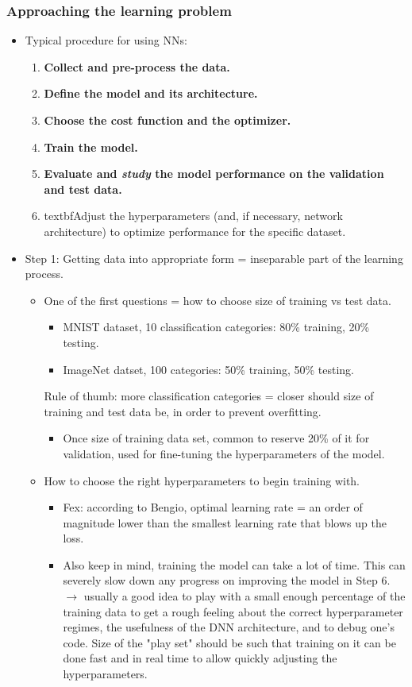 \documentclass[norsk,a4paper,11pt]{article}
\begin{document}
\subsubsection{Approaching the learning problem}
\begin{itemize}
	\item Typical procedure for using NNs:
	\begin{enumerate}
		\item \textbf{Collect and pre-process the data.}
		\item \textbf{Define the model and its architecture.}
		\item \textbf{Choose the cost function and the optimizer.}
		\item \textbf{Train the model.}
		\item \textbf{Evaluate and \textit{study} the model performance on the validation and test data.}
		\item textbf{Adjust the hyperparameters (and, if necessary, network architecture) to optimize performance for the specific dataset.}
	\end{enumerate}
	\item Step 1: Getting data into appropriate form = inseparable part of the learning process. 
	\begin{itemize}
		\item One of the first questions = how to choose size of training vs test data.
		\begin{itemize}
			\item MNIST dataset, 10 classification categories: 80\% training, 20\% testing.
			\item ImageNet datset, 100 categories: 50\% training, 50\% testing.
		\end{itemize}
		Rule of thumb: more classification categories = closer should size of training and test data be, in order to prevent overfitting.
		\begin{itemize}
			\item Once size of training data set, common to reserve 20\% of it for validation, used for fine-tuning the hyperparameters of the model.
		\end{itemize}
		\item How to choose the right hyperparameters to begin training with. 
		\begin{itemize}
			\item Fex: according to Bengio, optimal learning rate = an order of magnitude lower than the smallest learning rate that blows up the loss.
			\item Also keep in mind, training the model can take a lot of time. This can severely slow down any progress on improving the model in Step 6. $\rightarrow$ usually a good idea to play with a small enough percentage of the training data to get a rough feeling about the correct hyperparameter regimes, the usefulness of the DNN architecture, and to debug one's code. Size of the "play set" should be such that training on it can be done fast and in real time to allow quickly adjusting the hyperparameters.

\end{itemize}
\end{itemize}
\end{itemize}
\end{document}
